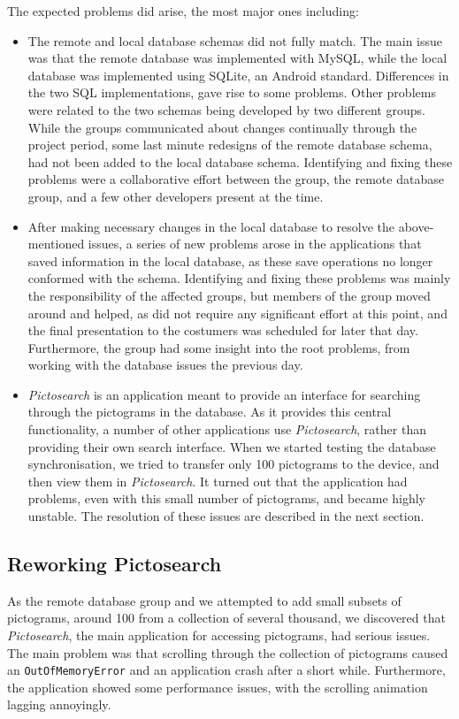 The expected problems did arise, the most major ones including:
\begin{itemize}
	\item The remote and local database schemas did not fully match. 
	The main issue was that the remote database was implemented with MySQL, while the local database was implemented using SQLite, an Android standard. 
	Differences in the two SQL implementations, gave rise to some problems. 
	Other problems were related to the two schemas being developed by two different groups.
	While the groups communicated about changes continually through the project period, some last minute redesigns of the remote database schema, had not been added to the local database schema.
	Identifying and fixing these problems were a collaborative effort between the \launcher group, the remote database group, and a few other developers present at the time. 
	\item After making necessary changes in the local database to resolve the above-mentioned issues, a series of new problems arose in the applications that saved information in the local database, as these save operations no longer conformed with the schema. 
	Identifying and fixing these problems was mainly the responsibility of the affected groups, but members of the \launcher group moved around and helped, as \launcher did not require any significant effort at this point, and the final presentation to the costumers was scheduled for later that day. 
	Furthermore, the \launcher group had some insight into the root problems, from working with the database issues the previous day.
	\item \textit{Pictosearch} is an application meant to provide an interface for searching through the pictograms in the database.
	As it provides this central functionality, a number of other applications use \textit{Pictosearch}, rather than providing their own search interface.
	When we started testing the database synchronisation, we tried to transfer only 100 pictograms to the device, and then view them in \textit{Pictosearch}.
	It turned out that the application had problems, even with this small number of pictograms, and became highly unstable. 
	The resolution of these issues are described in the next section.
\end{itemize}

\subsection{Reworking Pictosearch}
\label{sec:collab:remotedb:pictosearch}
As the remote database group and we attempted to add small subsets of pictograms, around 100 from a collection of several thousand, we discovered that \textit{Pictosearch}, the main application for accessing pictograms, had serious issues.
The main problem was that scrolling through the collection of pictograms caused an \lstinline!OutOfMemoryError! and an application crash after a short while.
Furthermore, the application showed some performance issues, with the scrolling animation lagging annoyingly.

